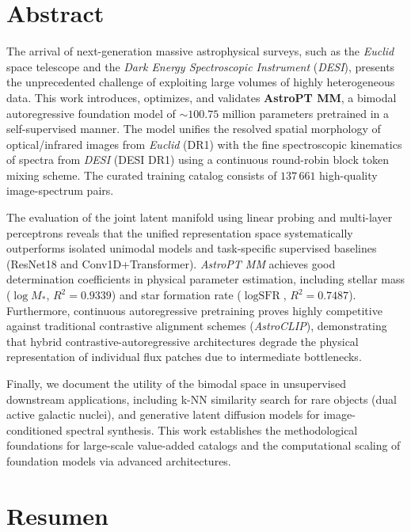 
\section*{Abstract}

The arrival of next-generation massive astrophysical surveys, such as the \textit{Euclid} space telescope and the \textit{Dark Energy Spectroscopic Instrument} (\textit{DESI}), presents the unprecedented challenge of exploiting large volumes of highly heterogeneous data. This work introduces, optimizes, and validates \textbf{AstroPT MM}, a bimodal autoregressive foundation model of $\sim 100.75$ million parameters pretrained in a self-supervised manner. The model unifies the resolved spatial morphology of optical/infrared images from \textit{Euclid} (DR1) with the fine spectroscopic kinematics of spectra from \textit{DESI} (DESI DR1) using a continuous round-robin block token mixing scheme. The curated training catalog consists of $137\,661$ high-quality image-spectrum pairs.

The evaluation of the joint latent manifold using linear probing and multi-layer perceptrons reveals that the unified representation space systematically outperforms isolated unimodal models and task-specific supervised baselines (ResNet18 and Conv1D+Transformer). \textit{AstroPT MM} achieves good determination coefficients in physical parameter estimation, including stellar mass ($\log M_*$, $R^2 = 0.9339$) and star formation rate ($\log\text{SFR}$, $R^2 = 0.7487$). Furthermore, continuous autoregressive pretraining proves highly competitive against traditional contrastive alignment schemes (\textit{AstroCLIP}), demonstrating that hybrid contrastive-autoregressive architectures degrade the physical representation of individual flux patches due to intermediate bottlenecks.

Finally, we document the utility of the bimodal space in unsupervised downstream applications, including k-NN similarity search for rare objects (dual active galactic nuclei), and generative latent diffusion models for image-conditioned spectral synthesis. This work establishes the methodological foundations for large-scale value-added catalogs and the computational scaling of foundation models via advanced architectures.


\section*{Resumen}

